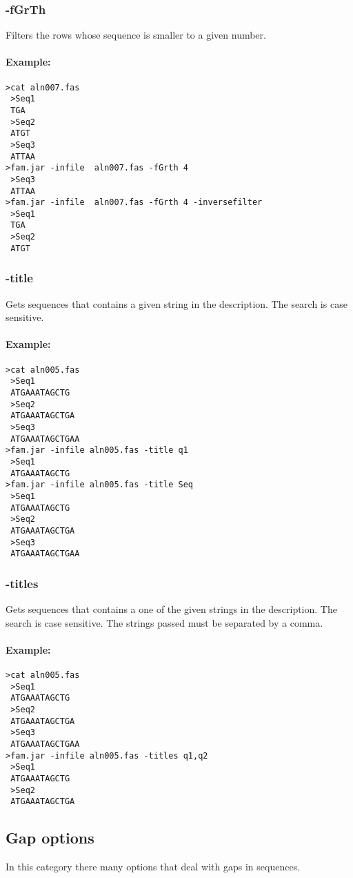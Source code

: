 \documentclass[a4paper, twoside,10pt]{article}
\begin{document}
\subsubsection{-fGrTh}
Filters the rows whose sequence is smaller to a given number.
\paragraph{Example:}
\begin{verbatim}
>cat aln007.fas
 >Seq1
 TGA
 >Seq2
 ATGT
 >Seq3
 ATTAA
>fam.jar -infile  aln007.fas -fGrth 4 
 >Seq3
 ATTAA
>fam.jar -infile  aln007.fas -fGrth 4 -inversefilter
 >Seq1
 TGA
 >Seq2
 ATGT
\end{verbatim}
\subsubsection{-title}
Gets sequences that contains a given string in the description. The search is
case sensitive.
\paragraph{Example:}
\begin{verbatim}
>cat aln005.fas
 >Seq1
 ATGAAATAGCTG
 >Seq2
 ATGAAATAGCTGA
 >Seq3
 ATGAAATAGCTGAA
>fam.jar -infile aln005.fas -title q1
 >Seq1
 ATGAAATAGCTG
>fam.jar -infile aln005.fas -title Seq
 >Seq1
 ATGAAATAGCTG
 >Seq2
 ATGAAATAGCTGA
 >Seq3
 ATGAAATAGCTGAA
\end{verbatim}

\subsubsection{-titles}
Gets sequences that contains a one of the given strings in the description. The
search is case sensitive. The strings passed must be separated by a comma.
\paragraph{Example:}
\begin{verbatim}
>cat aln005.fas
 >Seq1
 ATGAAATAGCTG
 >Seq2
 ATGAAATAGCTGA
 >Seq3
 ATGAAATAGCTGAA
>fam.jar -infile aln005.fas -titles q1,q2
 >Seq1
 ATGAAATAGCTG
 >Seq2
 ATGAAATAGCTGA
\end{verbatim}

\subsection{Gap options}
In this category there many options that deal with gaps in sequences.
\end{document}
